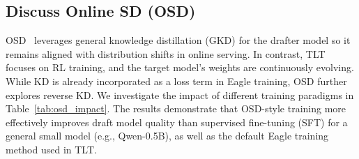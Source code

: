 \documentclass[sigplan,screen]{acmart}
\newcommand{\SysName}{\textrm{TLT}\xspace}
\begin{document}
\begin{table}[t]
\centering
\caption{Comparison of different SD methods in TLT (Qwen2.5-7B, TP=2, BS=1, on H100 GPU). Training cost is normalized to per-step Eagle's cost.}
\label{tab:sd_ablation}
\end{table}

\vspace{-10pt}
\subsection{Discuss Online SD (OSD)}
OSD~\cite{OSD} leverages general knowledge distillation (GKD) for the drafter model so it remains aligned with distribution shifts in online serving. In contrast, \SysName focuses on RL training, and the target model's weights are continuously evolving. While KD is already incorporated as a loss term in Eagle training, OSD further explores reverse KD. We investigate the impact of different training paradigms in Table~\ref{tab:osd_impact}. The results demonstrate that OSD-style training more effectively improves draft model quality than supervised fine-tuning (SFT) for a general small model (e.g., Qwen-0.5B), as well as the default Eagle training method used in TLT. 
\end{document}
